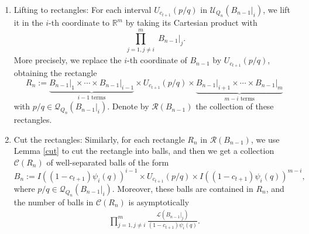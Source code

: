 \documentclass[11pt]{amsart}
\numberwithin{equation}{section}
\newcommand{\R}{{\Bbb R}}
\newcommand{\0}{\mathbf{0}}
\theoremstyle{remark}
\def\R{\mathcal R}
\def\R{\mathbb R}
\begin{document}
{\begin{enumerate}
    $$\psi(q)<\frac{1}{2 Q_n^2}.$$
    Therefore, one can shrink each ball in $\mathcal{B}(B_{n-1}\vert_i)$ so that its radius is reduced from
     $$1/2\cdot Q_n^{-2}\textrm{ to }\psi(q).$$
    and then form the corresponding annulus $A_{c_{t+1}}(p/q)$ from each shrunken ball. %
    We select one of its two intervals arbitrarily and denote by $U_{c_{t+1}}(p/q)$. The collection of all such selected intervals is denoted by $\mathcal{U}_{Q_n}(B_{n-1}\vert_i)$.
    \item {Lifting to rectangles:} For each interval $U_{c_{t+1}}(p/q)$ in $\mathcal{U}_{Q_n}(B_{n-1}\vert_i)$, we lift it in the $i$-th coordinate to $\R^m$ by taking its Cartesian product with $$\prod_{\substack{j=1,j\neq i}}^{m}B_{n-1}\vert_j.$$ More precisely, we replace the $i$-th coordinate of $B_{n-1}$ by $U_{c_{t+1}}(p/q)$, obtaining the rectangle $$R_{n}:=\underbrace{B_{n-1}\vert_1\times\cdots\times B_{n-1}\vert_{i-1}}_{i-1\text{ terms}} \times U_{c_{t+1}}(p/q)\times \underbrace{B_{n-1}\vert_{i+1}\times\cdots\times B_{n-1}\vert_m}_{m-i\text{ terms}}$$
    with $p/q\in \mathcal{Q}_{Q_n}(B_{n-1}\vert_i)$. Denote by $\mathcal{R}(B_{n-1})$ the collection of these rectangles.
    \item Cut the rectangles: Similarly, for each rectangle $R_n$ in $\mathcal{R}(B_{n-1})$, we use Lemma \ref{cut} to cut the rectangle into balls, and then we get a collection $\mathcal{C}(R_{n})$ of well-separated balls of the form
    $$B_{n}:=I((1-c_{t+1})\psi_i(q))^{i-1}\times U_{c_{t+1}}(p/q)\times I((1-c_{t+1})\psi_i(q))^{m-i},$$
    where $p/q\in \mathcal{Q}_{Q_n}(B_{n-1}\vert_i)$. Moreover, these balls are contained in $R_{n}$, and the number of balls in $\mathcal{C}(R_{n})$ is asymptotically 
    \begin{align}\label{est2}
        \prod_{j=1,j\neq i}^{m}\frac{\mathcal{L}(B_{n-1}\vert_j)}{(1-c_{t+1})\psi_i(q)}.
        \end{align}


\end{enumerate}}
\end{document}
